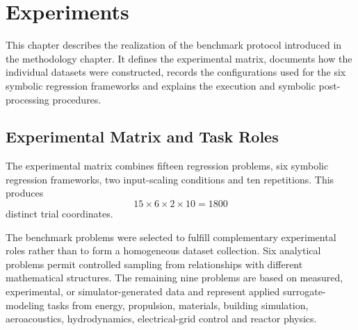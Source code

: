 \documentclass[12pt,oneside,bibtotoc,liststotoc]{scrbook}
\begin{document}
\chapter{Experiments}

This chapter describes the realization of the benchmark protocol introduced in the methodology chapter. It defines the experimental matrix, documents how the individual datasets were constructed, records the configurations used for the six symbolic regression frameworks and explains the execution and symbolic post-processing procedures.

\section{Experimental Matrix and Task Roles}

The experimental matrix combines fifteen regression problems, six symbolic regression frameworks, two input-scaling conditions and ten repetitions. This produces
\begin{equation}
    15 \times 6 \times 2 \times 10 = 1800
\end{equation}
distinct trial coordinates.

The benchmark problems were selected to fulfill complementary experimental roles rather than to form a homogeneous dataset collection. Six analytical problems permit controlled sampling from relationships with different mathematical structures. The remaining nine problems are based on measured, experimental, or simulator-generated data and represent applied surrogate-modeling tasks from energy, propulsion, materials, building simulation, aeroacoustics, hydrodynamics, electrical-grid control and reactor physics.
\end{document}
